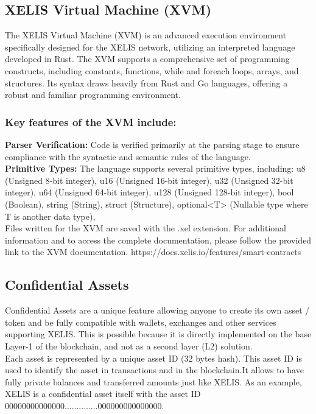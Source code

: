 \documentclass[10pt,a4paper,twocolumn]{article}
\begin{document}
\subsection{XELIS Virtual Machine (XVM)}

The XELIS Virtual Machine (XVM) is an advanced execution environment specifically designed for the XELIS network, utilizing an interpreted language developed in Rust. The XVM supports a comprehensive set of programming constructs, including constants, functions, while and foreach loops, arrays, and structures. Its syntax draws heavily from Rust and Go languages, offering a robust and familiar programming environment.\\

\subsubsection{Key features of the XVM include:}

\textbf{Parser Verification:} Code is verified primarily at the parsing stage to ensure compliance with the syntactic and semantic rules of the language.\\

\textbf{Primitive Types:} The language supports several primitive types, including:
u8 (Unsigned 8-bit integer),
u16 (Unsigned 16-bit integer),
u32 (Unsigned 32-bit integer),
u64 (Unsigned 64-bit integer),
u128 (Unsigned 128-bit integer),
bool (Boolean),
string (String),
struct (Structure),
optional<T> (Nullable type where T is another data type),\\

Files written for the XVM are saved with the .xel extension. For additional information and to access the complete documentation, please follow the provided link to the XVM documentation. https://docs.xelis.io/features/smart-contracts 

\subsection{Confidential Assets}

Confidential Assets are a unique feature allowing anyone to create its own asset / token and be fully compatible with wallets, exchanges and other services supporting XELIS. This is possible because it is directly implemented on the base Layer-1 of the blockchain, and not as a second layer (L2) solution.\\

Each asset is represented by a unique asset ID (32 bytes hash). This asset ID is used to identify the asset in transactions and in the blockchain.It allows to have fully private balances and transferred amounts just like XELIS. As an example, XELIS is a confidential asset itself with the asset ID 00000000000000..............000000000000000.\\
\end{document}
